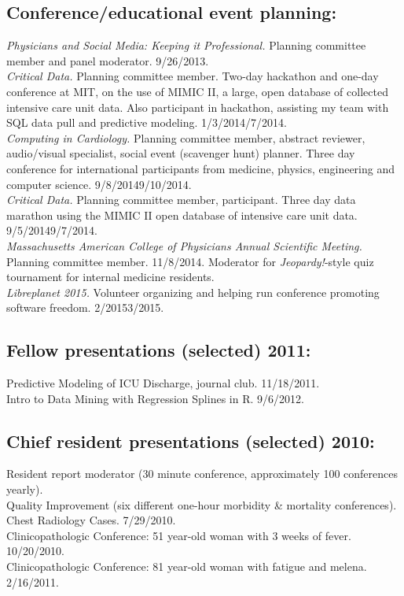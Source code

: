 \documentclass[12pt]{article}
\begin{document}
\subsection*{Conference/educational event planning:} %
\emph{Physicians and Social Media: Keeping it Professional.} Planning
committee member and panel moderator. 9/26/2013.\\
\emph{Critical Data.} Planning committee member. Two-day hackathon and
one-day conference at MIT, on the use of MIMIC II, a large, open
database of collected intensive care unit data. Also participant in
hackathon, assisting my team with SQL data pull and predictive
modeling. 1/3/2014\ndash{}/7/2014.\\
\emph{Computing in Cardiology.} Planning committee member, abstract
reviewer, audio/visual specialist, social event (scavenger hunt)
planner. Three day conference for international participants from
medicine, physics, engineering and computer science.
9/8/2014\ndash{}9/10/2014.\\
\emph{Critical Data.} Planning committee member, participant. Three
day data marathon using the MIMIC II open database of intensive care
unit data. 9/5/2014\ndash{}9/7/2014.\\
\emph{Massachusetts American College of Physicians Annual Scientific
  Meeting.} Planning committee member. 11/8/2014. Moderator for
\emph{Jeopardy!}-style quiz tournament for internal medicine
residents.\\
\emph{Libreplanet 2015.} Volunteer organizing and helping run
conference promoting software freedom. 2/2015\ndash{}3/2015.

\subsection*{Fellow presentations (selected) 2011:}
Predictive Modeling of ICU Discharge, journal club. 11/18/2011.\\
Intro to Data Mining with Regression Splines in R. 9/6/2012.

\subsection*{Chief resident presentations (selected) 2010:}
Resident report moderator (30 minute conference, approximately 100
conferences yearly).\\
Quality Improvement (six different one-hour morbidity \& mortality
conferences).\\
Chest Radiology Cases. 7/29/2010.\\
Clinicopathologic Conference: 51 year-old woman with 3 weeks of fever.
10/20/2010.\\
Clinicopathologic Conference: 81 year-old woman with fatigue and
melena. 2/16/2011.
\end{document}
